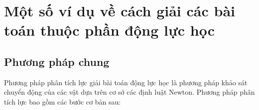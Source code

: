 \let\lesson\undefined
\newcommand{\lesson}{\phantomlesson{Bài 13: Một số ví dụ về cách giải các bài toán thuộc phần động lực học}}
\chapter[Một số ví dụ về cách giải các bài toán thuộc phần động lực học]{Một số ví dụ về cách giải các bài toán thuộc phần động lực học}
\setcounter{section}{0}
\section{Phương pháp chung}

Phương pháp phân tích lực giải bài toán động lực học là phương pháp khảo sát chuyển động của các vật dựa trên cơ sở các định luật Newton. Phương pháp phân tích lực bao gồm các bước cơ bản sau:
